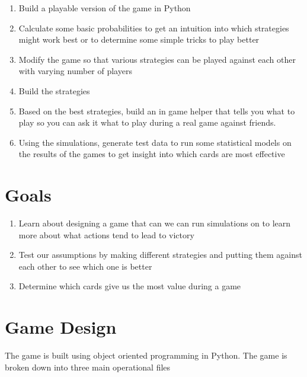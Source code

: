 \documentclass[11pt, oneside]{article}   	%
\begin{document}
	\begin{enumerate}
 		 \item Build a playable version of the game in Python
		 \item Calculate some basic probabilities to get an intuition into which strategies might work best or to determine some simple tricks to play better
		 \item Modify the game so that various strategies can be played against each other with varying number of players
		 \item Build the strategies
		 \item Based on the best strategies, build an in game helper that tells you what to play so you can ask it what to play during a real game against friends.
		 \item Using the simulations, generate test data to run some statistical models on the results of the games to get insight into which cards are most effective
	\end{enumerate}


\section{Goals}

	\begin{enumerate}
 		 \item Learn about designing a game that can we can run simulations on to learn more about what actions tend to lead to victory
		 \item Test our assumptions by making different strategies and putting them against each other to see which one is better
		 \item Determine which cards give us the most value during a game
	\end{enumerate}


\section{Game Design}

The game is built using object oriented programming in Python. The game is broken down into three main operational files
\end{document}
